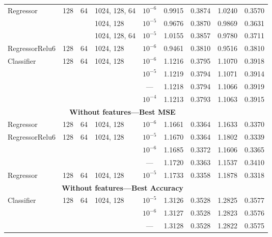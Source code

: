 \begin{table}
\begin{tabular}{lcclccccc}
Regressor & 128 & 64 & 1024, 128, 64 & $10^{-6}$   &  0.9915 &      0.3874 &   1.0240 &        0.3570 \\
           &     &    & 1024, 128 & $10^{-5}$   &  0.9676 &      0.3870 &   0.9869 &        0.3631 \\
           &     &    & 1024, 128, 64 & $10^{-5}$   &  1.0155 &      0.3857 &   0.9780 &        0.3711 \\
RegressorRelu6 & 128 & 64 & 1024, 128 & $10^{-6}$   &  0.9461 &      0.3810 &   0.9516 &        0.3810 \\
Classifier & 128 & 64 & 1024, 128 & $10^{-6}$   &  1.1216 &      0.3795 &   1.1070 &        0.3918 \\
           &     &    &                                 & $10^{-5}$   &  1.1219 &      0.3794 &   1.1071 &        0.3914 \\
           &     &    &                                 & ---   &  1.1218 &      0.3794 &   1.1066 &        0.3919 \\
           &     &    &                                 & $10^{-4}$   &  1.1213 &      0.3793 &   1.1063 &        0.3915 \\
\midrule
\multicolumn{8}{c}{\textbf{Without features---Best MSE}}\\\addlinespace
Regressor & 128 & 64 & 1024, 128 & $10^{-6}$  &  1.1661 &      0.3364 &   1.1633 &        0.3370 \\
RegressorRelu6 & 128 & 64 & 1024, 128 & $10^{-5}$  &  1.1670 &      0.3364 &   1.1802 &        0.3339 \\
           &     &    &                                 & $10^{-6}$  &  1.1685 &      0.3372 &   1.1606 &        0.3365 \\
           &     &    &                                 & ---  &  1.1720 &      0.3363 &   1.1537 &        0.3410 \\
Regressor & 128 & 64 & 1024, 128 & $10^{-5}$  &  1.1733 &      0.3358 &   1.1878 &        0.3318 \\
\midrule
\multicolumn{8}{c}{\textbf{Without features---Best Accuracy}}\\\addlinespace
Classifier & 128 & 64 & 1024, 128 & $10^{-5}$  &  1.3126 &      0.3528 &   1.2825 &        0.3577 \\
           &     &    &                                 & $10^{-6}$  &  1.3127 &      0.3528 &   1.2823 &        0.3576 \\
           &     &    &                                 & ---  &  1.3128 &      0.3528 &   1.2822 &        0.3575 \\
           

\end{tabular}
\end{table}
